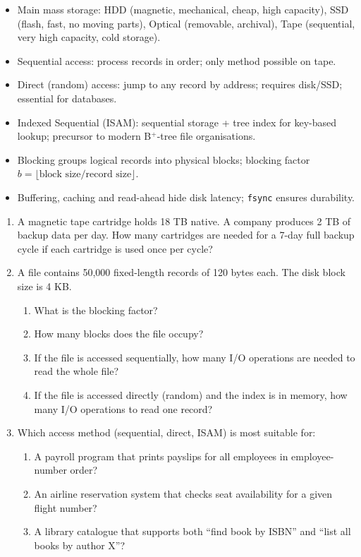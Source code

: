 \documentclass[11pt]{article}
\begin{document}
\begin{aretenir}
\begin{itemize}
\item Main mass storage: HDD (magnetic, mechanical, cheap, high capacity), SSD (flash, fast, no moving parts), Optical (removable, archival), Tape (sequential, very high capacity, cold storage).
\item Sequential access: process records in order; only method possible on tape.
\item Direct (random) access: jump to any record by address; requires disk/SSD; essential for databases.
\item Indexed Sequential (ISAM): sequential storage + tree index for key-based lookup; precursor to modern B$^+$-tree file organisations.
\item Blocking groups logical records into physical blocks; blocking factor $b = \lfloor \text{block size} / \text{record size} \rfloor$.
\item Buffering, caching and read-ahead hide disk latency; \texttt{fsync} ensures durability.
\end{itemize}
\end{aretenir}

\begin{exercice}
\begin{enumerate}
\item A magnetic tape cartridge holds 18 TB native. A company produces 2 TB of backup data per day. How many cartridges are needed for a 7-day full backup cycle if each cartridge is used once per cycle?
\item A file contains 50,000 fixed-length records of 120 bytes each. The disk block size is 4 KB.
  \begin{enumerate}
  \item What is the blocking factor?
  \item How many blocks does the file occupy?
  \item If the file is accessed sequentially, how many I/O operations are needed to read the whole file?
  \item If the file is accessed directly (random) and the index is in memory, how many I/O operations to read one record?
  \end{enumerate}
\item Which access method (sequential, direct, ISAM) is most suitable for:
  \begin{enumerate}
  \item A payroll program that prints payslips for all employees in employee-number order?
  \item An airline reservation system that checks seat availability for a given flight number?
  \item A library catalogue that supports both ``find book by ISBN'' and ``list all books by author X''?
  \end{enumerate}
\end{enumerate}
\end{exercice}
\end{document}
